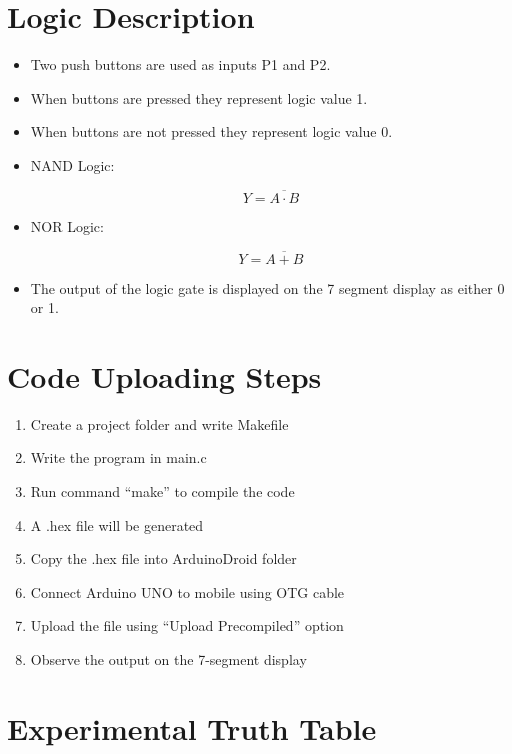 \documentclass[a4paper,12pt]{article}
\begin{document}
\section*{Logic Description}

\begin{itemize}

\item Two push buttons are used as inputs P1 and P2.
\item When buttons are pressed they represent logic value 1.
\item When buttons are not pressed they represent logic value 0.

\item NAND Logic:

\[
Y = \overline{A \cdot B}
\]

\item NOR Logic:

\[
Y = \overline{A + B}
\]

\item The output of the logic gate is displayed on the 7 segment display as either 0 or 1.

\end{itemize}

\section*{Code Uploading Steps}

\begin{enumerate}

\item Create a project folder and write Makefile
\item Write the program in main.c
\item Run command ``make'' to compile the code
\item A .hex file will be generated
\item Copy the .hex file into ArduinoDroid folder
\item Connect Arduino UNO to mobile using OTG cable
\item Upload the file using ``Upload Precompiled'' option
\item Observe the output on the 7-segment display

\end{enumerate}

\section*{Experimental Truth Table}
\end{document}
